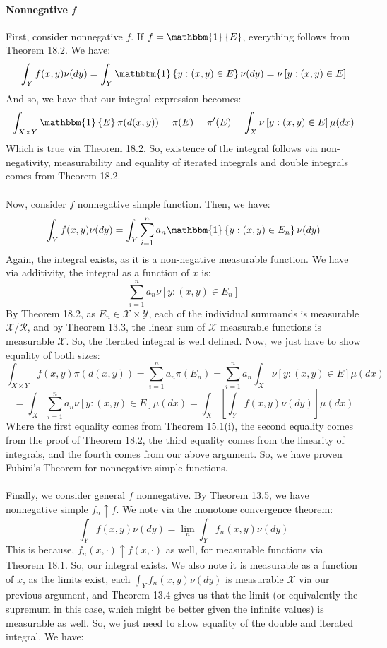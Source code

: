 \documentclass[12pt,a4paper]{article}
\newcommand{\1}[1]{\mathbbm{1}\left\{ #1 \right\}}
\newcommand{\rcal}{\mathcal{R}}
\newcommand{\xcal}{\mathcal{X}}
\newcommand{\ycal}{\mathcal{Y}}
\begin{document}
\paragraph{Nonnegative $f$} First, consider nonnegative $f$. If $f = \1{E}$, everything follows from Theorem 18.2. We have:
$$
	\int_Y f(x,y) \nu(dy) = \int_Y \1{y : (x,y) \in E} \nu(dy) = \nu\left[y : (x,y) \in E\right]
$$
And so, we have that our integral expression becomes:
$$
	\int_{X \times Y} \1{E} \pi(d(x,y)) = \pi(E)
	= \pi'(E) = \int_X \nu\left[y : (x,y) \in E\right] \mu(dx)
$$
Which is true via Theorem 18.2. So, existence of the integral follows via non-negativity, measurability and equality of iterated integrals and double integrals comes from Theorem 18.2.
\\\\
Now, consider $f$ nonnegative simple function. Then, we have:
$$
	\int_Y f(x,y) \nu(dy) = \int_Y \sum_{i=1}^n a_n \1{y : (x,y) \in E_n} \nu(dy)
$$
Again, the integral exists, as it is a non-negative measurable function. We have via additivity, the integral as a function of $x$ is:
$$
	\sum_{i=1}^n a_n \nu\left[y : (x,y) \in E_n\right]
$$
By Theorem 18.2, as $E_n \in \xcal \times \ycal$, each of the individual summands is measurable $\xcal/\rcal$, and by Theorem 13.3, the linear sum of $\xcal$ measurable functions is measurable $\xcal$. So, the iterated integral is well defined. Now, we just have to show equality of both sizes:
$$
	\int_{X \times Y} f(x,y) \pi(d(x,y)) = 
	\sum_{i=1}^n a_n \pi(E_n) =
	\sum_{i=1}^n a_n \int_X \nu\left[y : (x,y) \in E\right] \mu(dx)
$$
$$
	= \int_X \sum_{i=1}^n a_n \nu\left[y : (x,y) \in E\right] \mu(dx) =
	\int_X \left[\int_Y f(x,y) \nu(dy)\right] \mu(dx)
$$
Where the first equality comes from Theorem 15.1(i), the second equality comes from the proof of Theorem 18.2, the third equality comes from the linearity of integrals, and the fourth comes from our above argument. So, we have proven Fubini's Theorem for nonnegative simple functions.
\\\\
Finally, we consider general $f$ nonnegative. By Theorem 13.5, we have nonnegative simple $f_n \uparrow f$. We note via the monotone convergence theorem:
$$
	\int_Y f(x,y) \nu(dy) =
	\lim_n \int_Y f_n(x,y) \nu(dy)
$$
This is because, $f_n(x,\cdot) \uparrow f(x,\cdot)$ as well, for measurable functions via Theorem 18.1. So, our integral exists. We also note it is measurable as a function of $x$, as the limits exist, each $\int_Y f_n(x,y) \nu(dy)$ is measurable $\xcal$ via our previous argument, and Theorem 13.4 gives us that the limit (or equivalently the supremum in this case, which might be better given the infinite values) is measurable as well. So, we just need to show equality of the double and iterated integral. We have:
\end{document}

